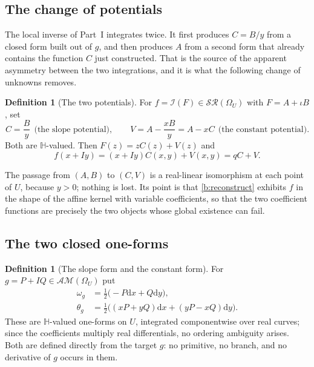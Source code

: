 \documentclass[11pt,a4paper]{article}
\numberwithin{equation}{section}
\theoremstyle{definition}
\newtheorem{definition}[theorem]{Definition}
\theoremstyle{remark}
\theoremstyle{plain}
\newcommand{\HH}{\mathbb H}
\newcommand{\I}{\mathcal I}
\newcommand{\SR}{\mathcal{SR}}
\newcommand{\AM}{\mathcal{AM}}
\newcommand{\Om}{\Omega}
\newcommand{\om}{\omega}
\newcommand{\thet}{\theta}
\newcommand{\pot}{C}          %
\newcommand{\potV}{V}         %
\newcommand{\dd}{\mathrm d}
\begin{document}
\subsection{The change of potentials}
\label{b:sub:potentials}

The local inverse of Part~I integrates twice.  It first produces
$\pot=B/y$ from a closed form built out of $g$, and then produces $A$ from a
second form that already contains the function $\pot$ just constructed.  That
is the source of the apparent asymmetry between the two integrations, and it
is what the following change of unknowns removes.

\begin{definition}[The two potentials]
\label{b:def:potentials}
For $f=\I(F)\in\SR(\Om_U)$ with $F=A+\iota B$, set
\begin{equation}
 \pot=\frac{B}{y}\ \ \text{(the slope potential)},\qquad
 \potV=A-\frac{xB}{y}=A-x\pot\ \ \text{(the constant potential)} .
 \label{b:CV}
\end{equation}
Both are $\HH$-valued.  Then $F(z)=z\pot(z)+\potV(z)$ and
\begin{equation}
 f(x+Iy)=(x+Iy)\pot(x,y)+\potV(x,y)=q\pot+\potV .
 \label{b:reconstruct}
\end{equation}
\end{definition}

The passage from $(A,B)$ to $(\pot,\potV)$ is a real-linear isomorphism at
each point of $U$, because $y>0$; nothing is lost.  Its point is that
\eqref{b:reconstruct} exhibits $f$ in the shape of the affine kernel with
variable coefficients, so that the two coefficient functions are precisely the
two objects whose global existence can fail.

\subsection{The two closed one-forms}
\label{b:sub:twoforms}

\begin{definition}[The slope form and the constant form]
\label{b:def:forms}
For $g=P+IQ\in\AM(\Om_U)$ put
\begin{align}
 \om_g&=\tfrac12\bigl(-P\dd x+Q\dd y\bigr),
 \label{b:omega}\\
 \thet_g&=\tfrac12\bigl((xP+yQ)\dd x+(yP-xQ)\dd y\bigr).
 \label{b:theta}
\end{align}
These are $\HH$-valued one-forms on $U$, integrated componentwise over real
curves; since the coefficients multiply real differentials, no ordering
ambiguity arises.  Both are defined directly from the target $g$: no primitive,
no branch, and no derivative of $g$ occurs in them.
\end{definition}
\end{document}
